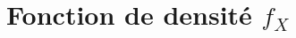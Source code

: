 \documentclass[handout]{BeamerTemplate}
\begin{document}
%
%
%
%
%
%
%
%
%
%
%
\section{Fonction de densité $f_X$}
\end{document}
